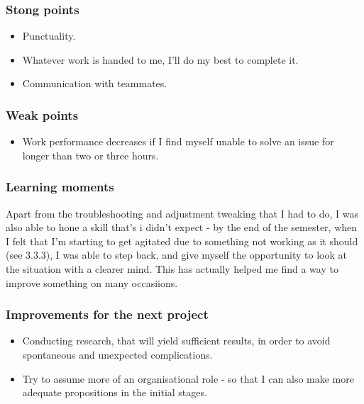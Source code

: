 \documentclass[10pt, a4paper]{article}
\begin{document}
\subsubsection{Stong points}
\begin{itemize}
	\item Punctuality.
	\item Whatever work is handed to me, I'll do my best to complete it.
	\item Communication with teammates. 
\end{itemize}
\subsubsection{Weak points}
\begin{itemize}
	\item Work performance decreases if I find myself unable to solve an issue for longer than two or three hours.
\end{itemize}
\subsubsection{Learning moments}
Apart from the troubleshooting and adjustment tweaking that I had to do, I was also able to hone a skill that's 
        i didn't expect - by the end of the semester, when I felt that I'm starting to get agitated due to something not working as it should (see 3.3.3),
        I was able to step back, and give myself the opportunity to look at the situation with a clearer mind. This has actually helped me 
        find a way to improve something on many occasiions.
\subsubsection{Improvements for the next project}
\begin{itemize}
	\item Conducting research, that will yield sufficient results, in order to avoid spontaneous and unexpected complications.
        \item Try to assume more of an organisational role - so that I can also make more adequate propositions in the initial stages.
\end{itemize}
\end{document}
